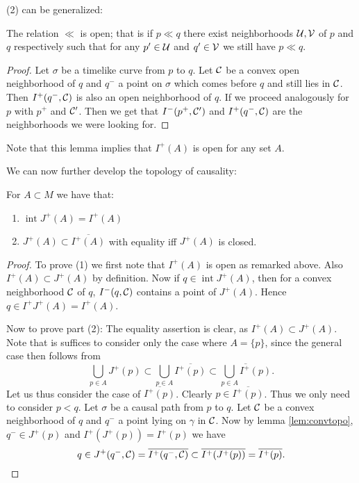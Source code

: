 (2) can be generalized:

\begin{lemma}\label{lem:Iopen}
The relation $\ll$ is open; that is if $p\ll q$ there exist neighborhoods $\mathcal{U},\mathcal{V}$ of $p$ and $q$ respectively such that for any $p'\in \mathcal{U}$ and $q'\in \mathcal{V}$ we still have $p\ll q$.
\end{lemma}
\begin{proof}
Let $\sigma$ be a timelike curve from $p$ to $q$. Let $\mathcal{C}$ be a convex open neighborhood of $q$ and $q^-$ a point on $\sigma$ which comes before $q$ and still lies in $\mathcal{C}$. Then $I^+(q^-,\mathcal{C})$ is also an open neighborhood of $q$. If we proceed analogously for $p$ with $p^+$ and $\mathcal{C}'$. Then we get that $I^-(p^+,\mathcal{C}')$ and $I^+(q^-,\mathcal{C})$ are the neighborhoods we were looking for.
\end{proof}

Note that this lemma implies that $I^+(A)$ is open for any set $A$.

We can now further develop the topology of causality:
\begin{lemma}
For $A \subset M$ we have that:
\begin{enumerate}[label={\textnormal{(\arabic*)}}]
    \item $\operatorname{int} J^+(A)=I^+(A)$
    \item $J^+(A)\subset\overline{I^+(A)}$ with equality iff $J^+(A)$ is closed.
\end{enumerate}
\end{lemma}
\begin{proof}
To prove (1) we first note that $I^+(A)$ is open as remarked above. Also $I^+(A)\subset J^+(A)$ by definition. Now if $q\in \operatorname{int}J^+(A)$, then for a convex neighborhood $\mathcal{C}$ of $q$, $I^-(q,\mathcal{C})$ contains a point of $J^+(A)$. Hence $q\in I^+J^+(A) = I^+(A)$.

Now to prove part (2): The equality assertion is clear, as $I^+(A)\subset J^+(A)$. Note that is suffices to consider only the case where $A=\{p\}$, since the general case then follows from
\[
\bigcup_{p\in A}J^+(p) \subset \bigcup_{p\in A}\overline{I^+(p)} \subset \overline{\bigcup_{p\in A}I^+(p)}.
\]
Let us thus consider the case of $\overline{I^+(p)}$. Clearly $p\in \overline{I^+(p)}$. Thus we only need to consider $p<q$. Let $\sigma$ be a causal path from $p$ to $q$. Let $\mathcal{C}$ be a convex neighborhood of $q$ and $q^-$ a point lying on $\gamma$ in $\mathcal{C}$. Now by lemma \ref{lem:convtopo}, $q^-\in J^+(p)$ and $I^+(J^+(p))=I^+(p)$ we have 
\[
q\in J^+(q^-,\mathcal{C}) = \overline{I^+(q^-,\mathcal{C})} \subset \overline{I^+(J^+(p))} = \overline{I^+(p)}.
\]
\end{proof}

